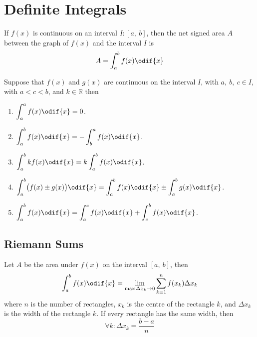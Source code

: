 \documentclass{article}
\begin{document}
\section{Definite Integrals}
\begin{theorem}
    If \(f(x)\) is continuous on an interval \(I:\left[ a,\:b \right]\), then the
    net signed area \(A\) between the graph of \(f(x)\) and the interval \(I\) is
    \begin{equation*}
        A = \int_a^b f(x) \odif{x}
    \end{equation*}
\end{theorem}
\begin{tcolorboxlarge}[title={Properties of Definite Integrals}]
    \begin{theorem}
        Suppose that \(f(x)\) and \(g(x)\) are continuous on the interval \(I\),
        with \(a,\:b,\:c\in I\), with \(a < c < b\), and \(k\in\mathbb{R}\) then
        \begin{enumerate}[label=\normalfont\alph*)] %
            \item \(\displaystyle\int_a^a f(x) \odif{x} = 0\).
            \item \(\displaystyle\int_a^b f(x) \odif{x} = -\int_b^a f(x) \odif{x}\).
            \item \(\displaystyle\int_a^b kf(x) \odif{x} = k\int_a^b f(x) \odif{x}\).
            \item \(\displaystyle\int_a^b \bigl(f(x) \pm g(x)\bigr) \odif{x} = \int_a^b f(x) \odif{x} \pm \int_a^b g(x) \odif{x}\).
            \item \(\displaystyle\int_a^b f(x) \odif{x} = \int_a^c f(x) \odif{x} + \int_c^b f(x) \odif{x}\).
        \end{enumerate}
    \end{theorem}
\end{tcolorboxlarge}
\subsection{Riemann Sums}
\begin{theorem}\label{theorem:1d_riemann_sums}
    Let \(A\) be the area under \(f(x)\) on the interval \(\left[ a,\:b \right]\),
    then
    \begin{equation*}
        \int_a^b f(x) \odif{x} = \lim_{\max{\Delta x_k}\to 0} \sum_{k=1}^n f(x_k) \Delta x_k
    \end{equation*}
    where \(n\) is the number of rectangles, \(x_k\) is the centre of the rectangle
    \(k\), and \(\Delta x_k\) is the width of the rectangle \(k\). If every rectangle
    has the same width, then
    \begin{equation*}
        \forall k:\Delta x_k = \frac{b-a}{n}
    \end{equation*}
\end{theorem}
\end{document}
